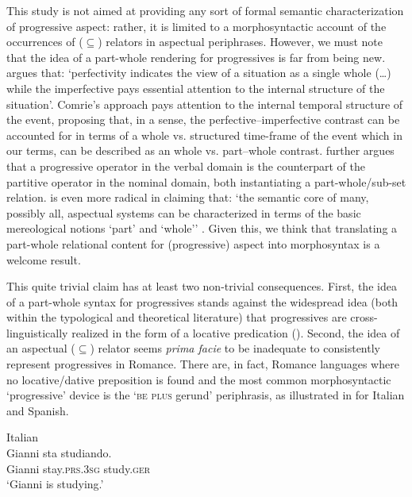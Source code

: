\documentclass[output=paper,modfonts,nonflat,newtxmath,colorlinks,citecolor=brown]{langsci/langscibook}
\begin{document}
This study is not aimed at providing any sort of formal semantic characterization of progressive aspect: rather, it is limited to a morphosyntactic account of the occurrences of (${\subseteq}$) relators in aspectual periphrases. However, we must note that the idea of a part-whole rendering for progressives is far from being new. \citet[16]{Comrie1976} argues that: ‘perfectivity indicates the view of a situation as a single whole (…) while the imperfective pays essential attention to the internal structure of the situation’. Comrie’s approach pays attention to the internal temporal structure of the event, proposing that, in a sense, the perfective–imperfective contrast can be accounted for in terms of a  whole vs. structured time-frame of the event which in our terms, can be described as an whole {vs}. part–whole contrast. \citet{Bach1986} further argues that a progressive operator in the verbal domain is the counterpart of the partitive operator in the nominal domain, both instantiating a part-whole/sub-set relation. \citet{Filip1999} is even more radical in claiming that: ‘the semantic core of many, possibly all, aspectual systems can be characterized in terms of the basic mereological notions ‘part’ and ‘whole’’ \citep[158]{Filip1999}. Given this, we think that translating a part-whole relational content for (progressive) aspect into morphosyntax is a welcome result.

This quite trivial claim has at least two non-trivial consequences. First, the idea of a part-whole syntax for progressives stands against the widespread idea (both within the typological and theoretical literature) that progressives are cross-linguistically realized in the form of a locative predication (\citealt{MateuAmadas1999, BybeeEtAl1994, DemirdacheUribe-Etxebarria1997}).  Second, the idea of an aspectual (${\subseteq}$) relator seems \textit{prima facie} to be inadequate to consistently represent progressives in Romance. There are, in fact, Romance languages where no locative/dative preposition is found and the most common morphosyntactic ‘progressive’ device is the ‘\textsc{be plus} gerund’ periphrasis, as illustrated in  for Italian and Spanish. %

\ea%
    \label{ex:franco:9}
    \ea Italian\\\label{ex:franco:9a}
    \gll  Gianni sta studiando.  \\
         Gianni stay.\textsc{prs.3sg} study.\textsc{ger} \\
    \glt `Gianni is studying.'
\end{document}

